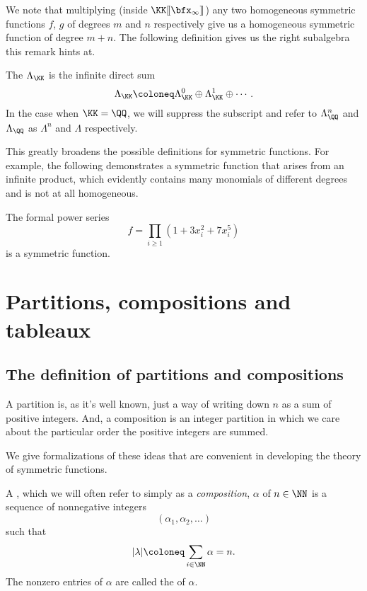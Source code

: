 \documentclass{article}
\newcommand{\fps}[2]{#1 [\kern-1.2pt[ {#2} ]\kern-1.2pt]}
\begin{document}
We note that multiplying (inside $\fps{\KK}{\bfx_\infty}$) any two homogeneous symmetric functions $f$, $g$ of degrees $m$ and $n$ respectively give us a homogeneous symmetric function of degree $m+n$.
The following definition gives us the right subalgebra this remark hints at.


\begin{definition}
    The  $\Lambda_\KK$ is the infinite direct sum
    \[
        \Lambda_\KK \coloneq \Lambda_\KK^0 \oplus\Lambda_\KK^1 \oplus \cdots.
    \]
    In the case when $\KK = \QQ$, we will suppress the subscript and refer to $\Lambda_\QQ^n$ and $\Lambda_\QQ$ as $\Lambda^n$ and $\Lambda$ respectively.
\end{definition}

This greatly broadens the possible definitions for symmetric functions. 
For example, the following demonstrates a symmetric function that arises from an infinite product, which evidently contains many monomials of different degrees and is not at all homogeneous.

\begin{example}
    The formal power series 
    \[
        f = \prod_{i\geq1} (1 + 3x_i^2 + 7x_i^5)
    \]
    is a symmetric function.
\end{example}

\section{Partitions, compositions and tableaux}

\subsection{The definition of partitions and compositions}

A partition is, as it's well known, just a way of writing down $n$ as a sum of positive integers.
And, a composition is an integer partition in which we care about the particular order the positive integers are summed.

We give formalizations of these ideas that are convenient in developing the theory of symmetric functions.

\begin{definition}
    A , which we will often refer to simply as a \textit{composition}, $\alpha$ of $n \in \NN$ is a sequence of nonnegative integers 
    \[
        (\alpha_1,\alpha_2,\ldots)
    \]
    such that 
    \[
        |\lambda|
        \coloneq
        \sum_{i\in\NN}\alpha
        =
        n.
    \]
    The nonzero entries of $\alpha$ are called the  of $\alpha$.
\end{definition}
\end{document}
